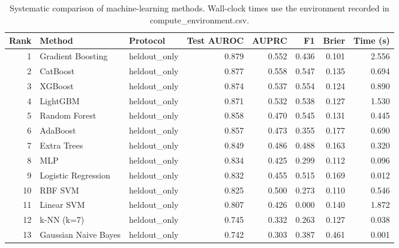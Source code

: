 \begin{table}[htbp]
\centering
\caption{Systematic comparison of machine-learning methods. Wall-clock times use the environment recorded in compute_environment.csv.}
\label{tab:method_comparison_recomputed}
\begin{tabular}{rllrrrrr}
\toprule
Rank & Method & Protocol & Test AUROC & AUPRC & F1 & Brier & Time (s) \\
\midrule
1 & Gradient Boosting & heldout\_only & 0.879 & 0.552 & 0.436 & 0.101 & 2.556 \\
2 & CatBoost & heldout\_only & 0.877 & 0.558 & 0.547 & 0.135 & 0.694 \\
3 & XGBoost & heldout\_only & 0.874 & 0.537 & 0.554 & 0.124 & 0.890 \\
4 & LightGBM & heldout\_only & 0.871 & 0.532 & 0.538 & 0.127 & 1.530 \\
5 & Random Forest & heldout\_only & 0.858 & 0.470 & 0.545 & 0.131 & 0.445 \\
6 & AdaBoost & heldout\_only & 0.857 & 0.473 & 0.355 & 0.177 & 0.690 \\
7 & Extra Trees & heldout\_only & 0.849 & 0.486 & 0.488 & 0.163 & 0.320 \\
8 & MLP & heldout\_only & 0.834 & 0.425 & 0.299 & 0.112 & 0.096 \\
9 & Logistic Regression & heldout\_only & 0.832 & 0.455 & 0.515 & 0.169 & 0.012 \\
10 & RBF SVM & heldout\_only & 0.825 & 0.500 & 0.273 & 0.110 & 0.546 \\
11 & Linear SVM & heldout\_only & 0.807 & 0.426 & 0.000 & 0.140 & 1.872 \\
12 & k-NN (k=7) & heldout\_only & 0.745 & 0.332 & 0.263 & 0.127 & 0.038 \\
13 & Gaussian Naive Bayes & heldout\_only & 0.742 & 0.303 & 0.387 & 0.461 & 0.001 \\
\bottomrule
\end{tabular}

\end{table}
